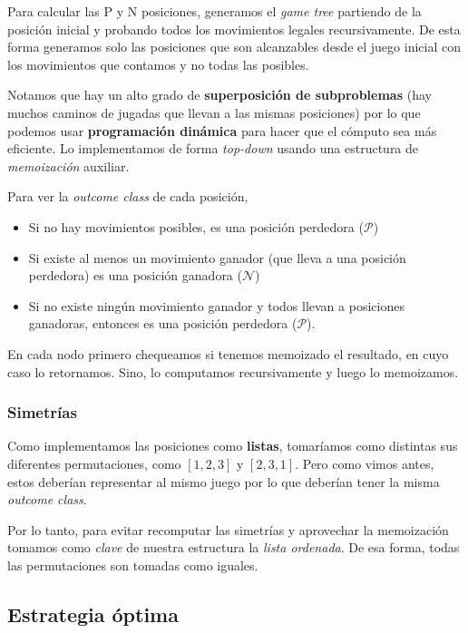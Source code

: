 \documentclass{article}
\newcommand{\calP}{$\mathcal{P}$}
\newcommand{\calN}{$\mathcal{N}$}
\newcommand{\trio}[3]{[#1, #2, #3]}
\begin{document}
Para calcular las P y N posiciones, generamos el \textit{game tree} partiendo de la posición inicial y probando todos los movimientos legales recursivamente. De esta forma generamos solo las posiciones que son alcanzables desde el juego inicial con los movimientos que contamos y no todas las posibles.

Notamos que hay un alto grado de \textbf{superposición de subproblemas} (hay muchos caminos de jugadas que llevan a las mismas posiciones) por lo que podemos usar \textbf{programación dinámica} para hacer que el cómputo sea más eficiente. Lo implementamos de forma \textit{top-down} usando una estructura de \textit{memoización} auxiliar.

Para ver la \textit{outcome class} de cada posición,

\begin{itemize}
    \item Si no hay movimientos posibles, es una posición perdedora (\calP{})
    \item Si existe al menos un movimiento ganador (que lleva a una posición perdedora) es una posición ganadora (\calN{})
    \item Si no existe ningún movimiento ganador y todos llevan a posiciones ganadoras, entonces es una posición perdedora (\calP{}).
\end{itemize}

En cada nodo primero chequeamos si tenemos memoizado el resultado, en cuyo caso lo retornamos. Sino, lo computamos recursivamente y luego lo memoizamos.

\subsubsection*{Simetrías}

Como implementamos las posiciones como \textbf{listas}, tomaríamos como distintas sus diferentes permutaciones, como $\trio{1}{2}{3}$ y $\trio{2}{3}{1}$. Pero como vimos antes, estos deberían representar al mismo juego por lo que deberían tener la misma \textit{outcome class}.

Por lo tanto, para evitar recomputar las simetrías y aprovechar la memoización tomamos como \textit{clave} de nuestra estructura la \textit{lista ordenada}. De esa forma, todas las permutaciones son tomadas como iguales.

\subsection*{Estrategia óptima}
\end{document}
